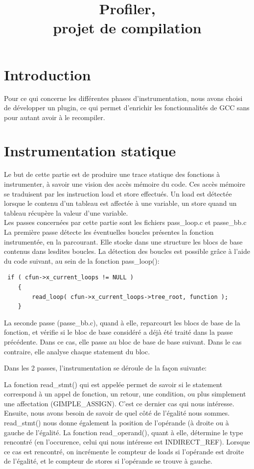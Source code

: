\documentclass[oneside,11pt]{article}
\title{Profiler,\\projet de compilation}
\begin{document}
\maketitle

\tableofcontents

\newpage
\section{Introduction}

Pour ce qui concerne les différentes phases d'instrumentation, nous avons choisi de développer un plugin, ce qui permet d'enrichir les fonctionnalités de GCC sans pour autant avoir à le recompiler.

\section{Instrumentation statique}

Le but de cette partie est de produire une trace statique des fonctions à instrumenter, à savoir une vision des accès mémoire du code. Ces accès mémoire se traduisent par les instruction load et store effectués. Un load est détectée lorsque le contenu d'un tableau est affectée à une variable, un store quand un tableau récupère la valeur d'une variable.\\

Les passes concernées par cette partie sont les fichiers pass\_loop.c et passe\_bb.c
La première passe détecte les éventuelles boucles présentes la fonction instrumentée, en la parcourant. Elle stocke dans une structure les blocs de base contenus dans lesdites boucles.
La détection des boucles est possible grâce à l'aide du code suivant, au sein de la fonction pass\_loop():
\begin{verbatim} 
 if ( cfun->x_current_loops != NULL )
	{
	    read_loop( cfun->x_current_loops->tree_root, function );
	}
\end{verbatim}

La seconde passe (passe\_bb.c), quand à elle, reparcourt les blocs de base de la fonction, et vérifie si le bloc de base considéré a déjà été traité dans la passe précédente. Dans ce cas, elle passe au bloc de base de base suivant. Dans le cas contraire, elle analyse chaque statement du bloc. 

Dans les 2 passes, l'instrumentation se déroule de la façon suivante:

La fonction read\_stmt() qui est appelée permet de savoir si le statement correspond à un appel de fonction, un retour, une condition, ou plus simplement une affectation (GIMPLE\_ASSIGN). C'est ce dernier cas qui nous intéresse.
Ensuite, nous avons besoin de savoir de quel côté de l'égalité nous sommes. read\_stmt() nous donne également la position de l'opérande (à droite ou à gauche de l'égalité. La fonction read\_operand(), quant à elle, détermine le type rencontré (en l'occurence, celui qui nous intéresse est INDIRECT\_REF).
Lorsque ce cas est rencontré, on incrémente le compteur de loads si l'opérande est droite de l'égalité, et le compteur de stores si l'opérande se trouve à gauche.
\end{document}
